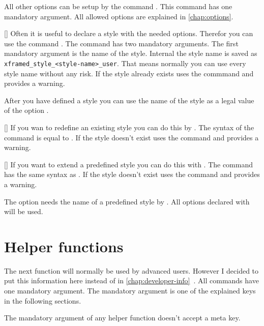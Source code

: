 \documentclass[openany,12pt,tocdepth=3]{ltx-md}
\begin{document}
All other options can be setup by the command .
This command has one mandatory argument. All allowed options are explained
in \autoref{chap:options}. 

[\MArgs]
Often it is useful to declare a style with the needed options. Therefor
you can use the command . The command
has two mandatory arguments. The first mandatory argument
is the name of the style. Internal the style name is saved
as \verb+xframed_style_<style-name>_user+. That means normally
you can use every style name without any risk. If the style already exists
 uses the commmand  and
provides a warning.

After you have defined a style you can use the name of the style as
a legal value of the option .

[\MArgs]
If you wan to redefine an existing style you can do this by 
. The syntax of the command
is equal to . If the style doesn't exist
 uses the command  and
provides a warning.

[\MArgs]
If you want to extend a predefined style you can do this
with . The command has the same
syntax as . If the style doesn't exist
 uses the command  and
provides a warning.

The option  needs the name of a predefined style
by  . All options declared with  
will be used.


\section{Helper functions}\label{sec:helperfunctions}
The next function will normally be used by advanced users. However
I decided to put this information here instead of in
\autoref{chap:developer-info}~.
All commands have one mandatory argument. The mandatory argument
is one of the explained keys in the following sections. 

\begin{Note}
The mandatory argument of any helper function doesn't accept a meta key.
\end{Note}
\end{document}
